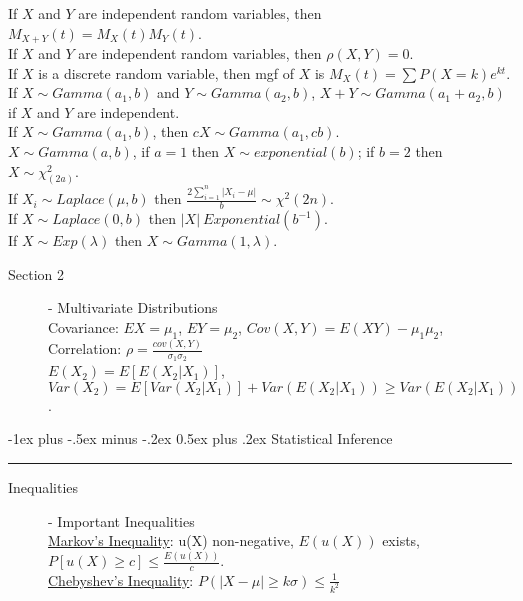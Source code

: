 \documentclass[10pt,landscape]{article}
\makeatletter
\renewcommand{\section}{\@startsection{section}{1}{0mm}%
                                {-1ex plus -.5ex minus -.2ex}%
                                {0.5ex plus .2ex}%
                                {\normalfont\large\bfseries}}
\renewcommand{\subsection}{\@startsection{subsection}{2}{0mm}%
                                {-1explus -.5ex minus -.2ex}%
                                {0.5ex plus .2ex}%
                                {\normalfont\normalsize\bfseries}}
\makeatother
\begin{document}
\begin{multicols}{3}
\begin{description}
If $X$ and $Y$ are independent random variables, then $M_{X+Y} (t) = M_{X}(t)M_{Y}(t)$.\\
If $X$ and $Y$ are independent random variables, then $\rho(X, Y) = 0$. \\
If $X$ is a discrete random variable,  then mgf of $X$ is $M_{X}(t) = \sum P(X = k)e^{kt}$. \\
If $X \sim Gamma(a_1,b)$ and $Y \sim Gamma(a_2,b)$, $X+Y \sim Gamma(a_1+a_2,b)$ if $X$ and $Y$ are independent. \\
If $X \sim Gamma(a_1,b)$, then $cX\sim Gamma(a_1, cb)$. \\
$X \sim Gamma(a,b)$, if $a=1$ then $X\sim exponential(b)$; if $b=2$ then $X\sim \chi_{(2a)}^2$. \\
If $X_i \sim Laplace(\mu, b)$ then $\frac{2 \sum_{i=1}^n |X_i-\mu|}{b} \sim \chi^2(2n) $.\\
If $X \sim Laplace(0, b)$ then $|X| ~ Exponential(b^{-1})$.\\
If $X \sim Exp(\lambda)$ then $X \sim Gamma(1, \lambda)$.\\

\end{description}

    \begin{description}
    		\item[Section 2] - Multivariate Distributions\\ %
    		Covariance: $EX = \mu_1$, $EY = \mu_2$, $Cov(X, Y) = E(XY) - \mu_1\mu_2$, \\
    		Correlation: $\rho = \frac{cov(X, Y)}{\sigma_1\sigma_2}$ \\
    		$E(X_2) = E[E(X_2|X_1)]$, $Var(X_2) = E[Var(X_2|X_1)] + Var(E(X_2|X_1)) \geq Var(E(X_2|X_1))$.
    		 
		
    		
    \end{description}    


\section{Statistical Inference}\smallskip \hrule height 1pt \smallskip


\begin{description}
\item[Inequalities] - Important Inequalities \\
	\underline{Markov's Inequality}: u(X) non-negative, $E(u(X))$ exists, $P[u(X)\geq c] \leq \frac{E(u(X))}{c}$.\\ 
	\underline{Chebyshev's Inequality}: $P(|X - \mu| \geq k\sigma) \leq \frac{1}{k^2}$
\end{description}


\end{multicols}
\end{document}
